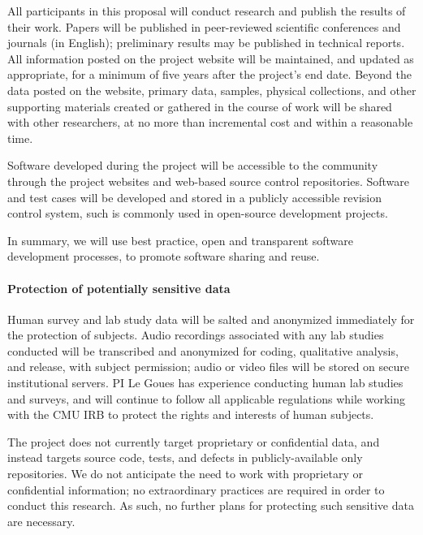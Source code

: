 \documentclass[11pt]{article}
\begin{document}
All participants in this proposal will conduct research and publish the results
of their work. Papers will be published in peer-reviewed scientific conferences
and journals (in English); preliminary results may be published in technical
reports.  All information posted on the project website will be maintained, and
updated as appropriate, for a minimum of five years after the project's end
date. Beyond the data posted on the website, primary data, samples, physical
collections, and other supporting materials created or gathered in the course of
work will be shared with other researchers, at no more than incremental cost and
within a reasonable time.  

Software developed during the project will be accessible to the community
through the project websites and web-based source control repositories. Software
and test cases will be developed and stored in a publicly accessible revision
control system, such is commonly used in open-source development projects.

In summary, we will use best practice, open and transparent software development
processes, to promote software sharing and reuse.

\paragraph{Protection of potentially sensitive data}
Human survey and lab study data will be salted and anonymized immediately for
the protection of subjects.  Audio recordings associated with any lab studies
conducted will be transcribed and anonymized for coding, qualitative analysis,
and release, with subject permission; audio or video files will be stored on
secure institutional servers.  PI Le Goues has experience conducting human lab
studies and surveys, and will continue to follow all applicable regulations
while working with the CMU IRB to protect the rights and interests of human
subjects.

The project does not currently target proprietary or confidential data, and
instead targets source code, tests, and defects in publicly-available only
repositories.  We do not anticipate the need to work with proprietary or
confidential information; no extraordinary practices are required in order to
conduct this research.  As such, no further plans for protecting such sensitive
data are necessary.

\end{document}
